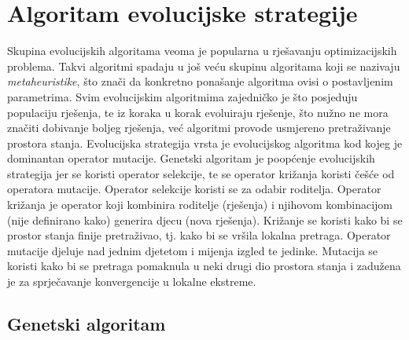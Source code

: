 \documentclass[times, utf8, diplomski, numeric]{fer}
\begin{document}
\section{Algoritam evolucijske strategije}

Skupina evolucijskih algoritama veoma je popularna u rješavanju optimizacijskih problema. Takvi algoritmi spadaju u još veću skupinu algoritama koji se nazivaju \emph{metaheuristike}, što znači da konkretno ponašanje algoritma ovisi o postavljenim parametrima. Svim evolucijskim algoritmima zajedničko je što posjeduju populaciju rješenja, te iz koraka u korak evoluiraju rješenje, što nužno ne mora značiti dobivanje boljeg rješenja, već algoritmi provode usmjereno pretraživanje prostora stanja. Evolucijska strategija vrsta je evolucijskog algoritma kod kojeg je dominantan operator mutacije. Genetski algoritam je poopćenje evolucijskih strategija jer se koristi operator selekcije, te se operator križanja koristi češće od operatora mutacije. Operator selekcije koristi se za odabir roditelja. Operator križanja je operator koji kombinira roditelje (rješenja) i njihovom kombinacijom (nije definirano kako) generira djecu (nova rješenja). Križanje se koristi kako bi se prostor stanja finije pretraživao, tj. kako bi se vršila lokalna pretraga. Operator mutacije djeluje nad jednim djetetom i mijenja izgled te jedinke. Mutacija se koristi kako bi se pretraga pomaknula u neki drugi dio prostora stanja i zadužena je za sprječavanje konvergencije u lokalne ekstreme. 

\subsection{Genetski algoritam}
\end{document}
